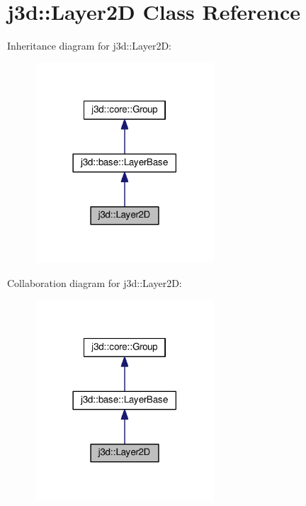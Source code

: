 \hypertarget{classj3d_1_1Layer2D}{}\section{j3d\+:\+:Layer2\+D Class Reference}
\label{classj3d_1_1Layer2D}


Inheritance diagram for j3d\+:\+:Layer2\+D\+:
\nopagebreak
\begin{figure}[H]
\begin{center}
\leavevmode
\includegraphics[width=189pt]{classj3d_1_1Layer2D__inherit__graph}
\end{center}
\end{figure}


Collaboration diagram for j3d\+:\+:Layer2\+D\+:
\nopagebreak
\begin{figure}[H]
\begin{center}
\leavevmode
\includegraphics[width=189pt]{classj3d_1_1Layer2D__coll__graph}
\end{center}
\end{figure}
